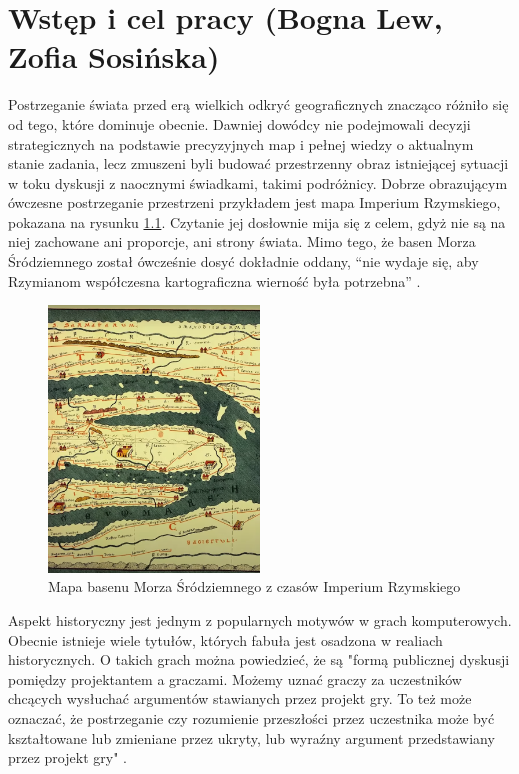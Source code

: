 \chapter{Wstęp i cel pracy (Bogna Lew, Zofia Sosińska)}\label{chap:introduction}

Postrzeganie świata przed erą wielkich odkryć geograficznych znacząco różniło się od tego, które dominuje obecnie. Dawniej
dowódcy nie podejmowali decyzji strategicznych na podstawie precyzyjnych map i pełnej wiedzy o aktualnym stanie zadania,
lecz zmuszeni byli budować przestrzenny obraz istniejącej sytuacji w toku dyskusji z naocznymi świadkami, takimi podróżnicy.
Dobrze obrazującym ówczesne postrzeganie
przestrzeni przykładem jest mapa Imperium Rzymskiego, pokazana na rysunku \ref{fig:mapaIR}. Czytanie jej dosłownie mija się z
celem, gdyż nie są na niej zachowane ani proporcje, ani strony świata. Mimo tego, że basen Morza Śródziemnego został
ówcześnie dosyć dokładnie oddany, “nie wydaje się, aby Rzymianom współczesna kartograficzna wierność była potrzebna” \cite{gbobrektvgry}.

\begin{figure}[htbp]
    \centering
    \includegraphics[width=0.5\textwidth]{images/mapaIR.png}
    \caption{Mapa basenu Morza Śródziemnego z czasów Imperium Rzymskiego}\label{fig:mapaIR}
\end{figure}

Aspekt historyczny jest jednym z popularnych motywów w grach komputerowych. Obecnie istnieje wiele tytułów, których
fabuła jest osadzona w realiach historycznych. O takich grach można powiedzieć, że są "formą publicznej dyskusji
pomiędzy projektantem a graczami. Możemy uznać graczy za uczestników chcących wysłuchać argumentów stawianych przez
projekt gry. To też może oznaczać, że postrzeganie czy rozumienie przeszłości przez uczestnika może być kształtowane lub
zmieniane przez ukryty, lub wyraźny argument przedstawiany przez projekt gry" \cite{perception_past}.

